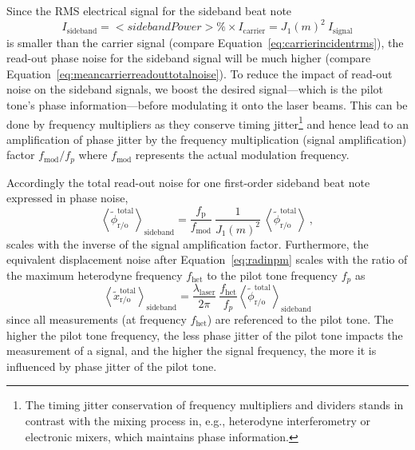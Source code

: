 \documentclass[fleqn,10pt]{<approot>/designer/latexelements/SelfArx} %
\begin{document}
Since the RMS electrical signal for the sideband beat note
\begin{equation}
I_\text{sideband} = <sidebandPower>\% \times I_\text{carrier} = J_1(m)^2\:I_\text{signal}
\label{eq:sidebandincidentrms}
\end{equation}
is smaller than the carrier signal (compare Equation~\ref{eq:carrierincidentrms}), the read-out phase noise for the sideband signal will be much higher (compare Equation~\ref{eq:meancarrierreadouttotalnoise}). To reduce the impact of read-out noise on the sideband signals, we boost the desired signal---which is the pilot tone's phase information---before modulating it onto the laser beams. This can be done by frequency multipliers as they conserve timing jitter\footnote{The timing jitter conservation of frequency multipliers and dividers stands in contrast with the mixing process in, e.g., heterodyne interferometry or electronic mixers, which maintains phase information.} and hence lead to an amplification of phase jitter by the frequency multiplication (signal amplification) factor $f_\text{mod}/f_p$ where $f_\text{mod}$ represents the actual modulation frequency.

Accordingly the total read-out noise for one first-order sideband beat note expressed in phase noise,
\begin{equation}
\left<\widetilde{\phi}_\text{r/o}^\text{total}\right>_\text{sideband} = \frac{f_\text{p}}{f_\text{mod}} \: \frac{1}{{J}_\text{1}(m)^2}\: \left<\widetilde{\phi}_\text{r/o}^\text{total}\right> ~,
\label{eq:meansidebandsreadouttotalnoisephase}
\end{equation}
scales with the inverse of the signal amplification factor. Furthermore, the equivalent displacement noise after Equation~\ref{eq:radinpm} scales with the ratio of the maximum heterodyne frequency $f_\text{het}$ to the pilot tone frequency $f_p$ as
\begin{equation}
\left<\widetilde{x}_\text{r/o}^\text{total}\right>_\text{sideband} = \frac{\lambda_\text{laser}}{2\pi} \: \frac{f_\text{het}}{f_p} \left<\widetilde{\phi}_\text{r/o}^\text{total}\right>_\text{sideband}
\label{eq:meansidebandsreadouttotalnoisepm}
\end{equation}
since all measurements (at frequency $f_\text{het}$) are referenced to the pilot tone. The higher the pilot tone frequency, the less phase jitter of the pilot tone impacts the measurement of a signal, and the higher the signal frequency, the more it is influenced by phase jitter of the pilot tone.
\end{document}
